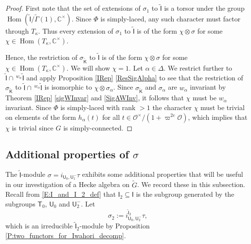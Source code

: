 \documentclass[10pt, letterpaper]{amsart}
\theoremstyle{plain}
\theoremstyle{definition}
\numberwithin{equation}{section}
\newcommand{\Gt}{\widetilde{G}}
\newcommand{\Hom}{\operatorname{Hom}}
\newcommand{\Ocal}{\mathcal{O}}
\newcommand{\If}{\mathsf{I}}
\newcommand{\Kf}{\mathsf{K}}
\newcommand{\Tf}{\mathsf{T}}
\newcommand{\Uf}{\mathsf{U}}
\newcommand{\Gammaf}{\mathsf{\Gamma}}
\newcommand{\Ift}{\widetilde{\mathsf{I}}}
\begin{document}
\begin{proof}
First note that the set of extensions of $\sigma_{1}$ to $\widetilde{{\If}}$ is a torsor under the group $\Hom(\widetilde{{\If}}/\widetilde{{\Gammaf}}(1),\mathbb{C}^{\times})$. Since $\Phi$ is simply-laced, any such character must factor through $T_{\kappa}$. Thus every extension of $\sigma_{1}$ to $\widetilde{{\If}}$ is of the form $\chi\otimes \sigma$ for some $\chi\in \Hom(T_{\kappa},\mathbb{C}^{\times})$. 

Hence, the restriction of $\sigma_{\widetilde{{\Kf}}}$ to $\widetilde{{\If}}$ is of the form $\chi\otimes \sigma$ for some $\chi\in \Hom(T_{\kappa},\mathbb{C}^{\times})$. We will show $\chi=1$. Let $\alpha\in\Delta$. We restrict further to $\widetilde{{\If}}\cap\,^{w_{\alpha}}\widetilde{{\If}}$ and apply Proposition \ref{IRep} \eqref{ResSigAlpha} to see that the restriction of $\sigma_{\widetilde{{\Kf}}}$ to $\widetilde{{\If}}\cap\,^{w_{\alpha}}\widetilde{{\If}}$ is isomorphic to $\chi\otimes \sigma_{\alpha}$. Since $\sigma_{\widetilde{{\Kf}}}$ and $\sigma_{\alpha}$ are $w_{\alpha}$ invariant by Theorem \ref{IRep} \eqref{sigWInvar} and \eqref{SigAWInv}, it follows that $\chi$ must be $w_{\alpha}$ invariant. Since $\Phi$ is simply-laced with rank $>1$ the character $\chi$ must be trivial on elements of the form $h_{\alpha}(t)$ for all $t\in \Ocal^{\times}/(1+\varpi^{2e}\Ocal)$, which implies that $\chi$ is trivial since $G$ is simply-connected.
\end{proof}



\subsection{Additional properties of $\sigma$}\label{SigProps}


The $\widetilde{{\If}}$-module $\sigma=i_{{\Uf}_{0},{\Uf}^{-}_{1}}\tau$ exhibits some additional properties that will be useful in our investigation of a Hecke algebra on $\Gt$. We record these in this subsection. Recall from \eqref{E:I_and_I_2_def} that ${\If}_{2}\subseteq {\If}$ is the subgroup generated by the subgroups ${\Tf}_{0}$, ${\Uf}_{0}$ and ${\Uf}^{-}_{2}$. Let
\[
\sigma_{2}:=i_{{\Uf}_{0},{\Uf}^{-}_{2}}^{\Ift_2}\tau,
\]
which is an irreducible $\widetilde{\If}_2$-module by Proposition \ref{P:two_functors_for_Iwahori_decomp}.
\end{document}
